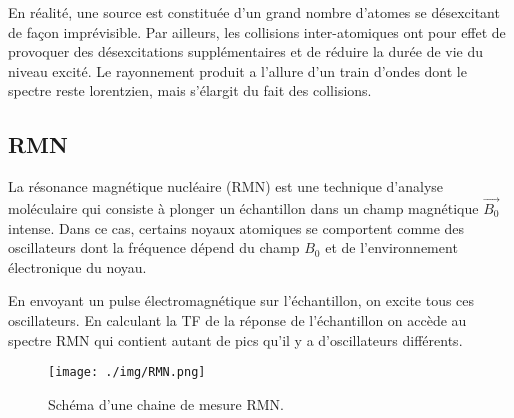 En réalité, une source est constituée d'un grand nombre d'atomes se désexcitant de façon imprévisible. Par ailleurs, les collisions inter-atomiques ont pour effet de provoquer des désexcitations supplémentaires et de réduire la durée de vie du niveau excité. Le rayonnement produit a l'allure d'un train d'ondes dont le spectre reste lorentzien, mais s'élargit du fait des collisions.
\subsection{RMN} %
\label{sub:la_rmn}
La résonance magnétique nucléaire (RMN) est une technique d'analyse moléculaire qui consiste à plonger un échantillon dans un champ magnétique  \(\overrightarrow{B_0}\) intense. Dans ce cas, certains noyaux atomiques se comportent comme des oscillateurs dont la fréquence dépend du champ \(B_0\) et de l'environnement électronique du noyau.

En envoyant un pulse électromagnétique sur l'échantillon, on excite tous ces oscillateurs. En calculant la TF de la réponse de l'échantillon on accède au spectre RMN qui contient autant de pics qu'il y a d'oscillateurs différents.
\begin{figure*}
\centering
\texttt{[image: ./img/RMN.png]}
\caption{Schéma d'une chaine de mesure RMN.}
\end{figure*}

